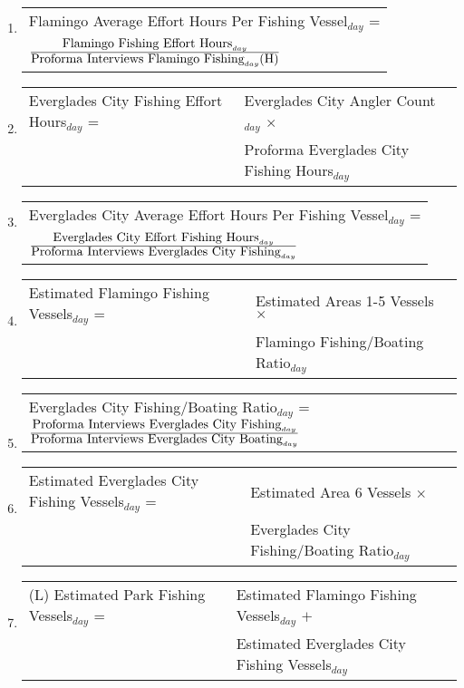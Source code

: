 \documentclass[letterpaper,12pt]{article}
\newcommand{\hspacer}{\hspace*{1cm}}
\newcommand{\fraction}[1]{\textrm{\normalsize{#1}}}
\begin{document}
\begin{enumerate}
\item
\begin{tabular}{l@{ }}
	Flamingo Average Effort Hours Per Fishing Vessel$_{day}$ = \\
\hspacer	$
\frac
	{\fraction{Flamingo Fishing Effort Hours}_{day}}
	{\fraction{Proforma Interviews Flamingo Fishing}_{day} \fraction{(H)}}
		$
\end{tabular}

\item
\begin{tabular}{l@{ }l@{ }}
	Everglades City Fishing Effort Hours$_{day}$ =
		& Everglades City Angler Count$_{day}$ $\times$ \\
		& Proforma Everglades City Fishing Hours$_{day}$ \\
\end{tabular}

\item
\begin{tabular}{l@{ }}
	Everglades City Average Effort Hours Per Fishing Vessel$_{day}$ = \\
\hspacer	$
\frac
	{\fraction{Everglades City Effort Fishing Hours}_{day}}
	{\fraction{Proforma Interviews Everglades City Fishing}_{day}}
		$
\end{tabular}

\item
\begin{tabular}{l@{ }l@{ }}
	Estimated Flamingo Fishing Vessels$_{day}$ = 
	& Estimated Areas 1-5 Vessels $\times$ \\
	& Flamingo Fishing/Boating Ratio$_{day}$
\end{tabular}

\item
\begin{tabular}{l@{ }l@{ }}
	Everglades City Fishing/Boating Ratio$_{day}$ =
		$
\frac
	{\fraction{Proforma Interviews Everglades City Fishing}_{day}}
      	{\fraction{Proforma Interviews Everglades City Boating}_{day}}
		$
\end{tabular}

\item
\begin{tabular}{l@{ }l@{ }}
	Estimated Everglades City Fishing Vessels$_{day}$ = 
	& Estimated Area 6 Vessels $\times$ \\
	& Everglades City Fishing/Boating Ratio$_{day}$
\end{tabular}

\item
\begin{tabular}{l@{ }l@{ }}
	(L) Estimated Park Fishing Vessels$_{day}$ =
	& Estimated Flamingo Fishing Vessels$_{day}$ $+$ \\
	& Estimated Everglades City Fishing Vessels$_{day}$ \\
\end{tabular}


\end{enumerate}
\end{document}
